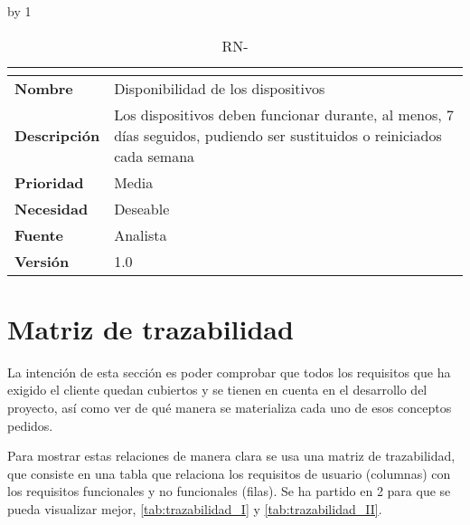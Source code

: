 \advance\rn by 1
\vspace{-.3cm}
\begin{table}[H]
	\caption{RN-\number\rn}
	\begin{tabular}{|l|p{}|}
		\hline
		\multicolumn{2}{|c|}{\cellcolor[HTML]{BFBFBF}{\color[HTML]{000000} \textbf{RN-\number\rn}}} \\ \hline
		\textbf{Nombre}      & Disponibilidad de los dispositivos                                                                                     \\ \hline
		\textbf{Descripción} & Los dispositivos deben funcionar durante, al menos, 7 días seguidos, pudiendo ser sustituidos o reiniciados cada semana \\ \hline
		\textbf{Prioridad}   & Media                                                                                                                  \\ \hline
		\textbf{Necesidad}   & Deseable                                                                                                               \\ \hline
		\textbf{Fuente}      & Analista                                                                                                               \\ \hline
		\textbf{Versión}     & 1.0                                                                                                                    \\ \hline
	\end{tabular}
\end{table}
\pagebreak

\section{Matriz de trazabilidad}\label{sec:matrizAnalisis}
La intención de esta sección es poder comprobar que todos los requisitos que ha exigido el cliente quedan cubiertos y se tienen en cuenta en el desarrollo del proyecto, así como ver de qué manera se materializa cada uno de esos conceptos pedidos. 

Para mostrar estas relaciones de manera clara se usa una matriz de trazabilidad, que consiste en una tabla que relaciona los requisitos de usuario (columnas) con los requisitos funcionales y no funcionales (filas). Se ha partido en 2 para que se pueda visualizar mejor, \autoref{tab:trazabilidad_I} y \autoref{tab:trazabilidad_II}.

